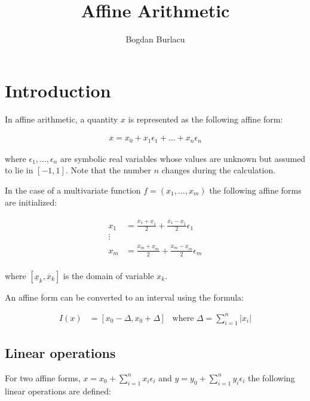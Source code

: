 \documentclass[fontsize=12pt,a4paper]{scrartcl} %
\title{Affine Arithmetic}
\author{Bogdan Burlacu}
\begin{document}

\maketitle

\section{Introduction}

In affine arithmetic, a quantity $x$ is represented as the following affine form:

\begin{align}
    x = x_0 + x_1 \epsilon_1 + ... + x_n \epsilon_n
\end{align}

where $\epsilon_1, ..., \epsilon_n$ are symbolic real variables whose values are unknown but assumed to lie in $[-1, 1]$. Note that the number $n$ changes during the calculation.

In the case of a multivariate function $f=(x_1,...,x_m)$ the following affine forms are initialized:

\begin{align}
    x_1 &= \frac{\overline{x}_1 + \underline{x}_1}{2} +  \frac{\overline{x}_1 - \underline{x}_1}{2} \epsilon_1\\
    \vdots\\
    x_m &= \frac{\overline{x}_m + \underline{x}_m}{2} +  \frac{\overline{x}_m - \underline{x}_m}{2} \epsilon_m\\
\end{align}

where $[\underline{x}_k, \overline{x}_k]$ is the domain of variable $x_k$.

An affine form can be converted to an interval using the formula:

\begin{align}
    I(x) &= [x_0 - \Delta, x_0 + \Delta] & \text{where } \Delta = \sum_{i=1}^n |x_i|
\end{align}


\subsection{Linear operations}

For two affine forms, $x = x_0 + \sum_{i=1}^n x_i \epsilon_i$ and $y = y_0 + \sum_{i=1}^n y_i \epsilon_i$ the following linear operations are defined:
\end{document}
